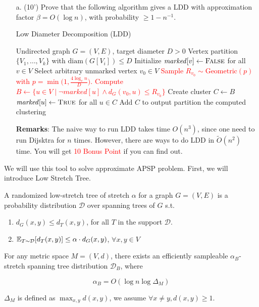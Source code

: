     \begin{itemize}
        \item [a. (10')] Prove that the following algorithm gives a LDD with approximation factor $\beta = O(\log n)$, with probability $\ge 1 - n ^ {-1}$.
\begin{algorithm}[H]
\caption{Low Diameter Decomposition (LDD)}
\label{alg:ldd}
\begin{algorithmic}[1]
\Require Undirected graph $G=(V,E)$, target diameter $D > 0$
\Ensure Vertex partition $\{V_1,\dots,V_k\}$ with $\mathrm{diam}(G[V_i]) \leq D$
\State Initialize $\mathit{marked}[v] \gets \textsc{False}$ for all $v \in V$
    \State Select arbitrary unmarked vertex $v_0 \in V$
    \State \textcolor{red}{Sample $R_{v_0} \sim \mathrm{Geometric}(p)$ with $p = \min\big(1, \frac{4\log_e n}{D}\big)$.}
    \State \textcolor{red}{Compute $B \gets \{u \in V \mid \lnot marked[u] \land  d_G(v_0,u) \leq R_{v_0}\}$}
    \State Create cluster $C \gets B$ 
    \State $\mathit{marked}[u] \gets \textsc{True}$ for all $u \in C$
    \State Add $C$ to output partition
\EndWhile
\State \Return the computed clustering
\end{algorithmic}
\end{algorithm}
\noindent \textbf{Remarks}: The naive way to run LDD takes time $O(n ^ 3)$, since one need to run Dijsktra for $n$ times. However, there are ways to do LDD in $\tilde{O}(n ^ 2)$ time. You will get \textcolor{red}{10 Bonus Point} if you can find out. 
    \end{itemize}


We will use this tool to solve approximate APSP problem. First, we will introduce Low Stretch Tree. 


\begin{definition}
    A randomized low-stretch tree of stretch  $\alpha$ for a graph $G=(V,E)$ is a probability distribution $\mathcal{D}$ over spanning trees of $G$ s.t.
    \begin{enumerate}
        \item $d_G(x, y) \le d_T(x, y)$, for all $T$ in the support $\mathcal{D}$.
        \item $\operatorname*{\mathbb{E}}_{T\sim \mathcal{D}}[d_T(x, y)] \le \alpha \cdot d_G(x,y)$, $\forall x, y \in V$
        
    \end{enumerate}
\end{definition}

\begin{theorem}\label{LST}
    For any metric space $M=(V, d)$, there exists an efficiently sampleable $\alpha_B$-stretch spanning tree distribution $\mathcal{D}_B$, where

$$
\alpha_B=O\left(\log n \log \Delta_M\right)
$$

$\Delta_M$ is defined as $\max_{x, y} d(x, y)$, we assume $\forall x\neq y, d(x, y) \ge 1$. 

\end{theorem}

